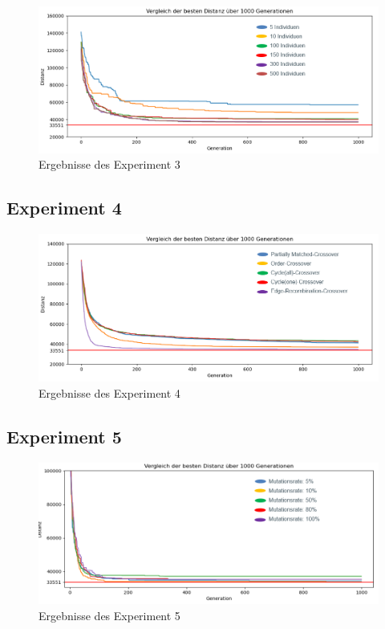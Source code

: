 \begin{figure}[H]
\centering
\includegraphics[width=1\textwidth]{img/Vortrag/experiment3.png}
\caption{Ergebnisse des Experiment 3}
\label{fig:experiment3}
\end{figure}

\subsection{Experiment 4}

\begin{figure}[H]
\centering
\includegraphics[width=1\textwidth]{img/Vortrag/experiment4.png}
\caption{Ergebnisse des Experiment 4}
\label{fig:experiment4}
\end{figure}

\subsection{Experiment 5}

\begin{figure}[H]
\centering
\includegraphics[width=1\textwidth]{img/Vortrag/experiment5.png}
\caption{Ergebnisse des Experiment 5}
\label{fig:experiment5}
\end{figure}

